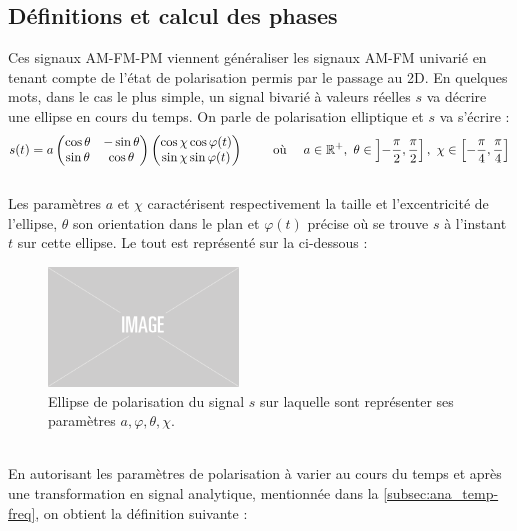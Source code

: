 \subsection{Définitions et calcul des phases} \label{subsec:AM-FM-PM}

Ces signaux AM-FM-PM viennent généraliser les signaux AM-FM univarié en tenant compte de l'état de polarisation permis par le passage au 2D. 
En quelques mots, dans le cas le plus simple, un signal bivarié à valeurs réelles $s$ va décrire une ellipse en cours du temps. 
On parle de polarisation elliptique et $s$ va s'écrire :
\[s(t) = a \begin{pmatrix} \cos\theta & -\sin\theta \\ \sin\theta  &  \cos\theta \end{pmatrix} \begin{pmatrix} \cos\chi \cos\varphi(t) \\ \sin\chi \sin\varphi(t) \end{pmatrix}  \qquad \text{ où }\quad  a\in\mathbb{R}^+,\ \theta \in \left]-\frac{\pi}{2}, \frac{\pi}{2}\right],\ \chi \in \left[-\frac{\pi}{4}, \frac{\pi}{4}\right] \]
\\
Les paramètres $a$ et $\chi$ caractérisent respectivement la taille et l'excentricité de l'ellipse, $\theta$ son orientation dans le plan et $\varphi(t)$ précise où se trouve $s$ à l'instant $t$ sur cette ellipse. 
Le tout est représenté sur la  ci-dessous :
\begin{figure}[h]
	\includegraphics[width=0.45\textwidth]{fig/placeholder}
	\caption[Ellipse de polarisation d'un signal bivarié réel]{Ellipse de polarisation du signal $s$ sur laquelle sont représenter ses paramètres $a,\varphi,\theta,\chi$.}
	\label{fig:ellipse2polat}
\end{figure}
\\
En autorisant les paramètres de polarisation à varier au cours du temps et après une transformation en signal analytique, mentionnée dans la \cref{subsec:ana_temp-freq}, on obtient la définition suivante :
\\
